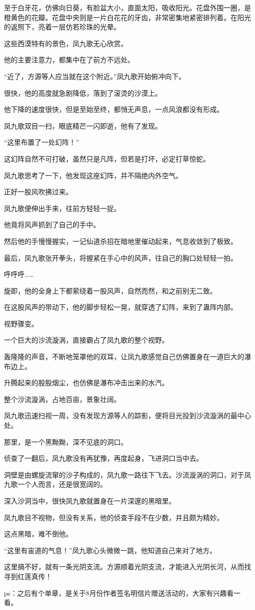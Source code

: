 \begin{this_body}
至于白牙花，仿佛向日葵，有脸盆大小，直面太阳，吸收阳光。花盘外围一圈，是橙黄色的花瓣。花盘中央则是一片白花花的牙齿，非常密集地紧密排列着。在阳光的返照下，亮着一层仿若珍珠的光晕。

这些西漠特有的景色，凤九歌无心欣赏。

他的主要注意力，都集中在了前方不远处。

“近了，方源等人应当就在这个附近。”凤九歌开始俯冲向下。

很快，他的高度就急剧降低，落到了滚烫的沙漠上。

他下降的速度很快，但是至始至终，都悄无声息，一点风浪都没有形成。

凤九歌双目一扫，眼底精芒一闪即逝，他有了发现。

“这里布置了一处幻阵！”

这幻阵自然不可打破，虽然只是凡阵，但若是打坏，必定打草惊蛇。

凤九歌思考了一下，他发现这座幻阵，并不隔绝内外空气。

正好一股风吹拂过来。

凤九歌便伸出手来，往前方轻轻一捉。

他竟将风声抓到了自己的手中。

然后他的手慢慢握实，一记仙道杀招在暗地里催动起来，气息收敛到了极致。

最后，凤九歌张开拳头，将握紧在手心中的风声，往自己的胸口处轻轻一拍。

呼呼呼……

旋即，他的全身上下都萦绕着一股风声，自然而然，和之前别无二致。

在这股风声的带动下，他的脚步轻松一晃，就穿透了幻阵，来到了蛊阵内部。

视野骤变。

一个巨大的沙流漩涡，直接霸占了凤九歌的整个视野。

轰隆隆的声音，不断地笼罩他的双耳，让凤九歌感觉自己仿佛置身在一道巨大的瀑布边上。

升腾起来的股股烟尘，也仿佛是瀑布冲击出来的水汽。

整个沙流漩涡，占地百亩，景象壮阔。

凤九歌迅速扫视一周，没有发现方源等人的踪影，便将目光投到沙流漩涡的最中心处。

那里，是一个黑黝黝，深不见底的洞口。

侦查了一翻后，凤九歌没有再犹豫，再度起身，飞进洞口当中去。

洞壁是由螺旋流窜的沙子构成的，凤九歌一路往下飞去。沙流漩涡的洞口，对于凤九歌一个人而言，还是很宽阔的。

深入沙洞当中，很快凤九歌就置身在一片深邃的黑暗里。

凤九歌目不视物，但没有关系，他的侦查手段不在少数，并且颇为精妙。

这点黑暗，难不倒他。

“这里有宙道的气息！”凤九歌心头微微一跳，他知道自己来对了地方。

这里搞不好，就有一条光阴支流。方源顺着光阴支流，才能进入光阴长河，从而找寻到红莲真传！

ps：之后有个单章，是关于8月份作者签名明信片赠送活动的，大家有兴趣看一看。

\end{this_body}
